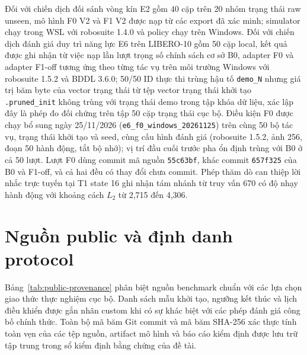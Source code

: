 Đối với chiến dịch đối sánh vòng kín E2 gồm 40 cặp trên 20 nhóm trạng thái raw unseen,
mô hình F0 V2 và F1 V2 được nạp từ các export đã xác minh; simulator chạy trong WSL
với robosuite 1.4.0 và policy chạy trên Windows. Đối với chiến dịch đánh giá duy trì
năng lực E6 trên LIBERO-10 gồm 50 cặp local, kết quả được ghi nhận từ việc nạp lần lượt
trọng số chính sách cơ sở B0, adapter F0 và adapter F1-off tương ứng theo từng tác vụ trên môi trường Windows với
robosuite 1.5.2 và BDDL 3.6.0; 50/50 ID thực thi trùng hậu tố \texttt{demo\_N} nhưng
giá trị băm byte của vector trạng thái từ tệp vector trạng thái khởi tạo \texttt{.pruned\_init} không trùng với trạng thái demo trong
tập khóa dữ liệu, xác lập đây là phép đo đối chứng trên tập 50 cặp trạng thái cục bộ. Điều kiện F0 được chạy bổ sung ngày 25/11/2026
(\texttt{e6\_f0\_windows\_20261125}) trên cùng 50 bộ tác vụ, trạng thái khởi tạo và seed, cùng cấu hình đánh giá
(robosuite 1.5.2, ảnh 256, đoạn 50 hành động, tắt bộ nhớ); vị trí đầu cuối trước pha ổn định trùng với B0 ở cả 50 lượt.
Lượt F0 dùng commit mã nguồn \texttt{55c63bf}, khác commit \texttt{657f325} của B0 và F1-off, và cả hai đều có thay đổi chưa commit. Phép thăm dò
can thiệp lời nhắc trực tuyến tại T1 state 16 ghi nhận tám nhánh từ truy vấn 670 có
độ nhạy hành động với khoảng cách $L_2$ từ 2,715 đến 4,306.

\section{Nguồn public và định danh protocol}

Bảng~\ref{tab:public-provenance} phân biệt nguồn benchmark chuẩn với các lựa chọn giao thức thực nghiệm cục bộ. Danh sách mẫu khởi tạo, ngưỡng kết thúc và lịch điều khiển được gắn nhãn custom khi có sự khác biệt với các phép đánh giá công bố chính thức. Toàn bộ mã băm Git commit và mã băm SHA-256 xác thực tính toàn vẹn của các tệp nguồn, artifact mô hình và báo cáo kiểm định được lưu trữ tập trung trong sổ kiểm định bằng chứng của đề tài.

